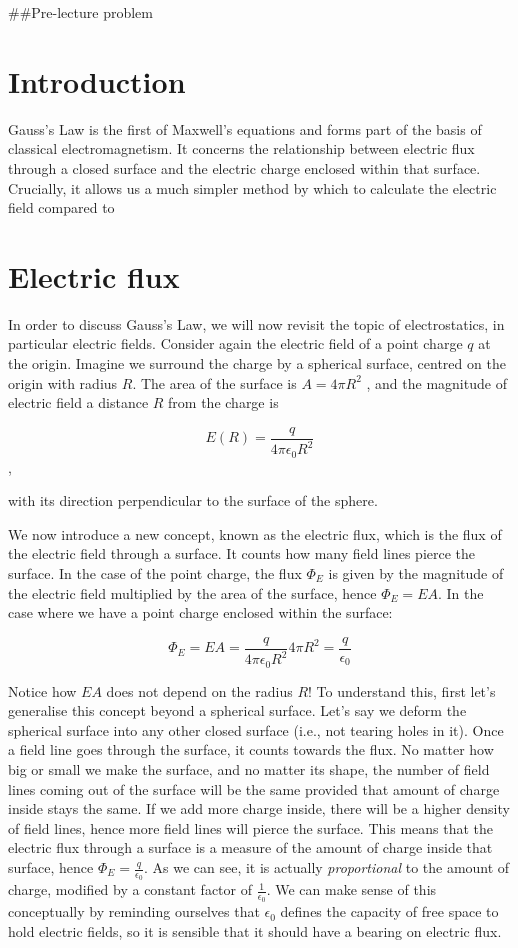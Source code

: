 \documentclass[
  letterpaper,
  DIV=11,
  numbers=noendperiod]{scrreprt}
\begin{document}
\#\#Pre-lecture problem

\section{Introduction}\label{introduction}

Gauss's Law is the first of Maxwell's equations and forms part of the
basis of classical electromagnetism. It concerns the relationship
between electric flux through a closed surface and the electric charge
enclosed within that surface. Crucially, it allows us a much simpler
method by which to calculate the electric field compared to

\section{Electric flux}\label{electric-flux}

In order to discuss Gauss's Law, we will now revisit the topic of
electrostatics, in particular electric fields. Consider again the
electric field of a point charge \(q\) at the origin. Imagine we
surround the charge by a spherical surface, centred on the origin with
radius \(R\). The area of the surface is \(A = 4\pi R^2\) , and the
magnitude of electric field a distance \(R\) from the charge is

\[ E(R) = \frac{q}{4\pi \epsilon_0 R^2} \],

with its direction perpendicular to the surface of the sphere.

We now introduce a new concept, known as the electric flux, which is the
flux of the electric field through a surface. It counts how many field
lines pierce the surface. In the case of the point charge, the flux
\(\Phi_E\) is given by the magnitude of the electric field multiplied by
the area of the surface, hence \(\Phi_E = EA\). In the case where we
have a point charge enclosed within the surface:

\[ \Phi_E = EA = \frac{q}{4\pi\epsilon_0 R^2} 4\pi R^2 = \frac{q}{\epsilon_0} \]

Notice how \(EA\) does not depend on the radius \(R\)! To understand
this, first let's generalise this concept beyond a spherical surface.
Let's say we deform the spherical surface into any other closed surface
(i.e., not tearing holes in it). Once a field line goes through the
surface, it counts towards the flux. No matter how big or small we make
the surface, and no matter its shape, the number of field lines coming
out of the surface will be the same provided that amount of charge
inside stays the same. If we add more charge inside, there will be a
higher density of field lines, hence more field lines will pierce the
surface. This means that the electric flux through a surface is a
measure of the amount of charge inside that surface, hence
\(\Phi_E = \frac{q}{\epsilon_0}\). As we can see, it is actually
\emph{proportional} to the amount of charge, modified by a constant
factor of \(\frac{1}{\epsilon_0}\). We can make sense of this
conceptually by reminding ourselves that \(\epsilon_0\) defines the
capacity of free space to hold electric fields, so it is sensible that
it should have a bearing on electric flux.
\end{document}
